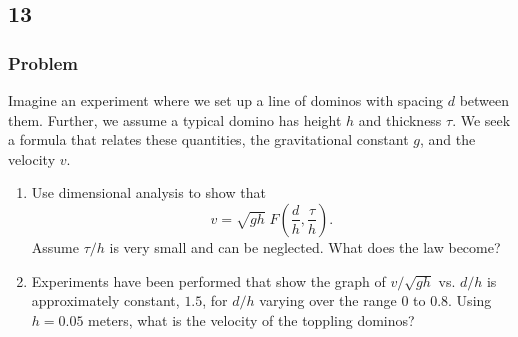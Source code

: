 \documentclass[12pt]{article}
\begin{document}
  \newpage
  \subsection{13}
  \subsubsection*{Problem}
  Imagine an experiment where we set up a line of dominos with spacing $d$
  between them. Further, we assume a typical domino has height $h$ and thickness
  $\tau$. We seek a formula that relates these quantities, the gravitational
  constant $g$, and the velocity $v$.

  \begin{enumerate}
  \item Use dimensional analysis to show
    that
    \begin{equation}
      \label{eq:13-1-question}
      v=\sqrt{gh}\; F\left(\frac{d}{h},\frac{\tau}{h}\right).
    \end{equation}
    Assume $\tau/h$ is very small and can be neglected. What does the law become?
  \item Experiments have been performed that show the graph of $v/\sqrt{gh}$ vs.
    $d/h$ is approximately constant, $1.5$, for $d/h$ varying over the range $0$
    to $0.8$. Using $h=0.05$ meters, what is the velocity of the toppling dominos?
  \end{enumerate}
\end{document}
